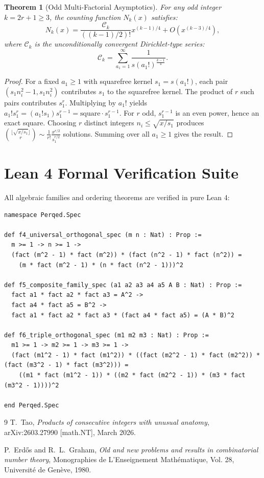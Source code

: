 \documentclass[11pt,a4paper]{article}
\newtheorem{theorem}{Theorem}
\begin{document}
\begin{theorem}[Odd Multi-Factorial Asymptotics]
For any odd integer $k = 2r + 1 \ge 3$, the counting function $N_k(x)$ satisfies:
\begin{equation}
N_k(x) = \frac{\mathcal{C}_k}{((k-1)/2)!} x^{(k-1)/4} + O(x^{(k-3)/4}),
\end{equation}
where $\mathcal{C}_k$ is the unconditionally convergent Dirichlet-type series:
\begin{equation}
\mathcal{C}_k = \sum_{a_1=1}^\infty \frac{1}{s(a_1!)^{\frac{k-1}{4}}}.
\end{equation}
\end{theorem}
\begin{proof}
For a fixed $a_1 \ge 1$ with squarefree kernel $s_1 = s(a_1!)$, each pair $(s_1 n_i^2 - 1, s_1 n_i^2)$ contributes $s_1$ to the squarefree kernel. The product of $r$ such pairs contributes $s_1^r$. Multiplying by $a_1!$ yields $a_1! s_1^r = (a_1! s_1) s_1^{r-1} = \text{square} \cdot s_1^{r-1}$.
For $r$ odd, $s_1^{r-1}$ is an even power, hence an exact square.
Choosing $r$ distinct integers $n_i \le \sqrt{x / s_1}$ produces $\binom{\lfloor\sqrt{x/s_1}\rfloor}{r} \sim \frac{1}{r!} \frac{x^{r/2}}{s_1^{r/2}}$ solutions. Summing over all $a_1 \ge 1$ gives the result.
\end{proof}

\section{Lean 4 Formal Verification Suite}
All algebraic families and ordering theorems are verified in pure Lean 4:

\begin{lstlisting}[language=Lean]
namespace Perqed.Spec

def f4_universal_orthogonal_spec (m n : Nat) : Prop :=
  m >= 1 -> n >= 1 ->
  (fact (m^2 - 1) * fact (m^2)) * (fact (n^2 - 1) * fact (n^2)) =
    (m * fact (m^2 - 1) * (n * fact (n^2 - 1)))^2

def f5_composite_family_spec (a1 a2 a3 a4 a5 A B : Nat) : Prop :=
  fact a1 * fact a2 * fact a3 = A^2 ->
  fact a4 * fact a5 = B^2 ->
  fact a1 * fact a2 * fact a3 * (fact a4 * fact a5) = (A * B)^2

def f6_triple_orthogonal_spec (m1 m2 m3 : Nat) : Prop :=
  m1 >= 1 -> m2 >= 1 -> m3 >= 1 ->
  (fact (m1^2 - 1) * fact (m1^2)) * ((fact (m2^2 - 1) * fact (m2^2)) * (fact (m3^2 - 1) * fact (m3^2))) =
    ((m1 * fact (m1^2 - 1)) * ((m2 * fact (m2^2 - 1)) * (m3 * fact (m3^2 - 1))))^2

end Perqed.Spec
\end{lstlisting}

\begin{thebibliography}{9}
T.~Tao,
\emph{Products of consecutive integers with unusual anatomy},
arXiv:2603.27990 [math.NT], March 2026.

P.~Erd\H{o}s and R.~L.~Graham,
\emph{Old and new problems and results in combinatorial number theory},
Monographies de L'Enseignement Math\'ematique, Vol. 28, Universit\'e de Gen\`eve, 1980.
\end{thebibliography}
\end{document}

